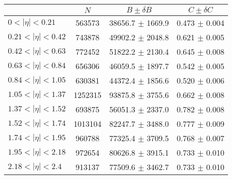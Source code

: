 \begin{tabular}{lccc}
\hline
    &   $N$   & $B \pm \delta B$  &  $C \pm \delta C$ \\
\hline
$0 < |\eta| <0.21$             & 563573     & 38656.7    $\pm$ 1669.9 & 0.473      $\pm$ 0.004 \\
$0.21 < |\eta| <0.42$          & 743878     & 49902.2    $\pm$ 2048.8 & 0.621      $\pm$ 0.005 \\
$0.42 < |\eta| <0.63$          & 772452     & 51822.2    $\pm$ 2130.4 & 0.645      $\pm$ 0.008 \\
$0.63 < |\eta| <0.84$          & 656306     & 46059.5    $\pm$ 1897.7 & 0.542      $\pm$ 0.005 \\
$0.84 < |\eta| <1.05$          & 630381     & 44372.4    $\pm$ 1856.6 & 0.520      $\pm$ 0.006 \\
$1.05 < |\eta| <1.37$          & 1252315    & 93875.8    $\pm$ 3755.6 & 0.662      $\pm$ 0.008 \\
$1.37 < |\eta| <1.52$          & 693875     & 56051.3    $\pm$ 2337.0 & 0.782      $\pm$ 0.008 \\
$1.52 < |\eta| <1.74$          & 1013104    & 82247.7    $\pm$ 3488.0 & 0.777      $\pm$ 0.009 \\
$1.74 < |\eta| <1.95$          & 960788     & 77325.4    $\pm$ 3709.5 & 0.768      $\pm$ 0.007 \\
$1.95 < |\eta| <2.18$          & 972654     & 80626.8    $\pm$ 3915.1 & 0.733      $\pm$ 0.010 \\
$2.18 < |\eta| <2.4$           & 913137     & 77509.6    $\pm$ 3462.7 & 0.733      $\pm$ 0.010 \\
\hline
\end{tabular}

